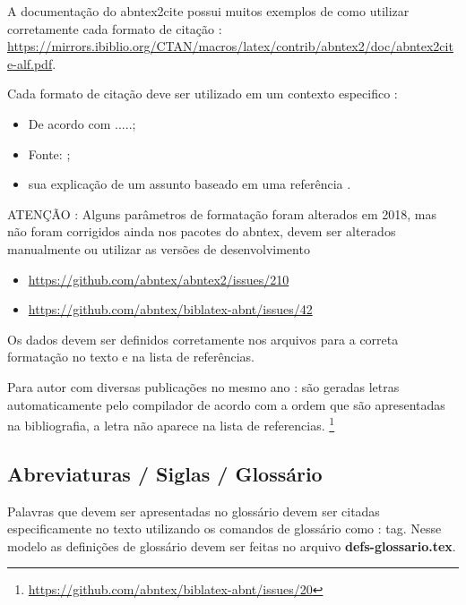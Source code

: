 A documentação do abntex2cite possui muitos exemplos de como utilizar corretamente cada formato de citação : \url{https://mirrors.ibiblio.org/CTAN/macros/latex/contrib/abntex2/doc/abntex2cite-alf.pdf}.

Cada formato de citação deve ser utilizado em um contexto especifico :
\begin{itemize}
    \item De acordo com  .....;
    
    \item Fonte: ;
    
    \item sua explicação de um assunto baseado em uma referência \cite{SCRUMGUIDE:2013}.
    
\end{itemize}

ATENÇÃO : Alguns parâmetros de formatação foram alterados em 2018, mas não foram corrigidos ainda nos pacotes do \ac{abntex}, devem ser alterados manualmente ou utilizar as versões de desenvolvimento
\begin{itemize}
    \item \url{https://github.com/abntex/abntex2/issues/210}
    
    \item \url{https://github.com/abntex/biblatex-abnt/issues/42}
\end{itemize}

Os dados devem ser definidos corretamente nos arquivos  para a correta formatação no texto e na lista de referências.

Para autor com diversas publicações no mesmo ano : são geradas letras automaticamente pelo compilador de acordo com a ordem que são apresentadas na bibliografia, a letra não aparece na lista de referencias. \footnote{\url{https://github.com/abntex/biblatex-abnt/issues/20}}




\subsection{Abreviaturas / Siglas / Glossário}
\label{siglas-glossario}

Palavras que devem ser apresentadas no glossário devem ser citadas especificamente no texto utilizando os comandos de glossário como : \gls{tag}. Nesse modelo as definições de glossário devem ser feitas no arquivo \textbf{defs-glossario.tex}.

